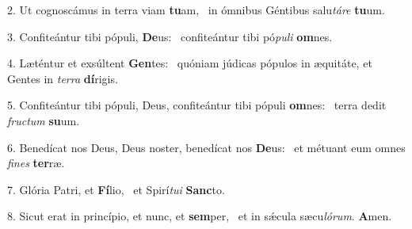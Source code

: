 2. Ut cognoscámus in terra viam \textbf{tu}am, \ast\  in ómnibus Géntibus salu\textit{tá}\textit{re} \textbf{tu}um.\

3. Confiteántur tibi pópuli, \textbf{De}us: \ast\  confiteántur tibi pó\textit{pu}\textit{li} \textbf{om}nes.\

4. Læténtur et exsúltent \textbf{Gen}tes: \ast\  quóniam júdicas pópulos in æquitáte, et Gentes in \textit{ter}\textit{ra} \textbf{dí}rigis.\

5. Confiteántur tibi pópuli, Deus, confiteántur tibi pópuli \textbf{om}nes: \ast\  terra dedit \textit{fruc}\textit{tum} \textbf{su}um.\

6. Benedícat nos Deus, Deus noster, benedícat nos \textbf{De}us: \ast\  et métuant eum omnes \textit{fi}\textit{nes} \textbf{ter}ræ.\

7. Glória Patri, et \textbf{Fí}lio, \ast\  et Spirí\textit{tu}\textit{i} \textbf{Sanc}to.\

8. Sicut erat in princípio, et nunc, et \textbf{sem}per, \ast\  et in sǽcula sæcu\textit{ló}\textit{rum}. \textbf{A}men.\

